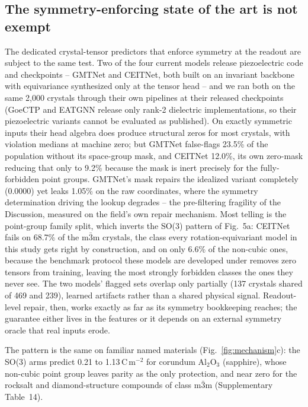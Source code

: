 \subsection*{The symmetry-enforcing state of the art is not exempt}

The dedicated crystal-tensor predictors that enforce symmetry at the readout are subject to the same test. Two of the four current models release piezoelectric code and checkpoints -- GMTNet\cite{yan2024gmtnet} and CEITNet\cite{ceitnet2026}, both built on an invariant backbone with equivariance synthesized only at the tensor head -- and we ran both on the same 2,000 crystals through their own pipelines at their released checkpoints (GoeCTP\cite{goectp2024} and EATGNN\cite{lu2025eatgnn} release only rank-2 dielectric implementations, so their piezoelectric variants cannot be evaluated as published). On exactly symmetric inputs their head algebra does produce structural zeros for most crystals, with violation medians at machine zero; but GMTNet false-flags 23.5\% of the population without its space-group mask, and CEITNet 12.0\%, its own zero-mask reducing that only to 9.2\% because the mask is inert precisely for the fully-forbidden point groups. GMTNet's mask repairs the idealized variant completely (0.0000) yet leaks 1.05\% on the raw coordinates, where the symmetry determination driving the lookup degrades -- the pre-filtering fragility of the Discussion, measured on the field's own repair mechanism. Most telling is the point-group family split, which inverts the SO(3) pattern of Fig.~5a: CEITNet fails on 68.7\% of the m$\bar 3$m crystals, the class every rotation-equivariant model in this study gets right by construction, and on only 6.6\% of the non-cubic ones, because the benchmark protocol these models are developed under removes zero tensors from training, leaving the most strongly forbidden classes the ones they never see. The two models' flagged sets overlap only partially (137 crystals shared of 469 and 239), learned artifacts rather than a shared physical signal. Readout-level repair, then, works exactly as far as its symmetry bookkeeping reaches; the guarantee either lives in the features or it depends on an external symmetry oracle that real inputs erode.

The pattern is the same on familiar named materials (Fig.~\ref{fig:mechanism}c): the SO(3) arms predict 0.21 to 1.13\,C\,m$^{-2}$ for corundum Al$_2$O$_3$ (sapphire), whose non-cubic point group leaves parity as the only protection, and near zero for the rocksalt and diamond-structure compounds of class m$\bar 3$m (Supplementary Table~14).

